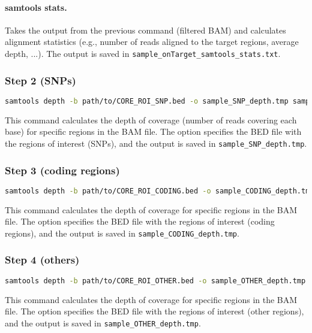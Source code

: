 \paragraph*{samtools stats.} Takes the output from the previous command (filtered BAM) and calculates alignment statistics (e.g., number of reads aligned to the target regions, average depth, ...). The output is saved in \texttt{sample\_onTarget\_samtools\_stats.txt}.

\subsubsection*{Step 2 (SNPs)}

\begin{lstlisting}[breaklines=true, language=bash]
    samtools depth -b path/to/CORE_ROI_SNP.bed -o sample_SNP_depth.tmp sample.bam; 
\end{lstlisting}

This command calculates the depth of coverage (number of reads covering each base) for specific regions in the BAM file. The  option specifies the BED file with the regions of interest (SNPs), and the output is saved in \texttt{sample\_SNP\_depth.tmp}.

\subsubsection*{Step 3 (coding regions)}

\begin{lstlisting}[breaklines=true, language=bash]
    samtools depth -b path/to/CORE_ROI_CODING.bed -o sample_CODING_depth.tmp sample.bam; 
\end{lstlisting}

This command calculates the depth of coverage for specific regions in the BAM file. The  option specifies the BED file with the regions of interest (coding regions), and the output is saved in \texttt{sample\_CODING\_depth.tmp}.

\subsubsection*{Step 4 (others)}

\begin{lstlisting}[breaklines=true, language=bash]
    samtools depth -b path/to/CORE_ROI_OTHER.bed -o sample_OTHER_depth.tmp sample.bam;
\end{lstlisting}

This command calculates the depth of coverage for specific regions in the BAM file. The  option specifies the BED file with the regions of interest (other regions), and the output is saved in \texttt{sample\_OTHER\_depth.tmp}.

